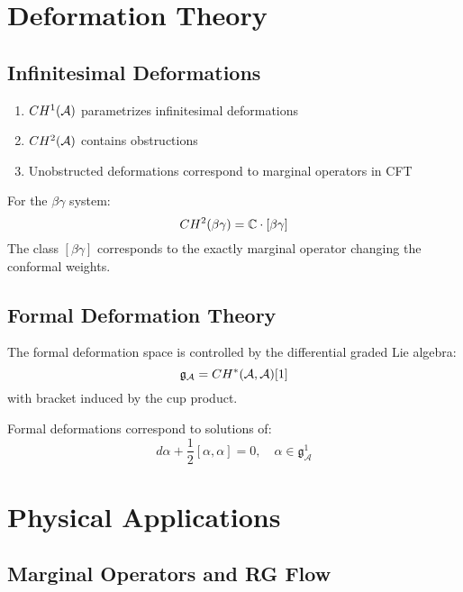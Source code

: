 \section{Deformation Theory}

\subsection{Infinitesimal Deformations}

\begin{theorem}
\begin{enumerate}
\item $CH^1(\mathcal{A})$ parametrizes infinitesimal deformations
\item $CH^2(\mathcal{A})$ contains obstructions
\item Unobstructed deformations correspond to marginal operators in CFT
\end{enumerate}
\end{theorem}

\begin{example}
For the $\beta\gamma$ system:
$$CH^2(\beta\gamma) = \mathbb{C} \cdot [\beta\gamma]$$
The class $[\beta\gamma]$ corresponds to the exactly marginal operator changing the conformal weights.
\end{example}

\subsection{Formal Deformation Theory}

The formal deformation space is controlled by the differential graded Lie algebra:
$$\mathfrak{g}_{\mathcal{A}} = CH^*(\mathcal{A}, \mathcal{A})[1]$$
with bracket induced by the cup product.

\begin{theorem}
Formal deformations correspond to solutions of:
$$d\alpha + \frac{1}{2}[\alpha, \alpha] = 0, \quad \alpha \in \mathfrak{g}_{\mathcal{A}}^1$$
\end{theorem}

\section{Physical Applications}

\subsection{Marginal Operators and RG Flow}

